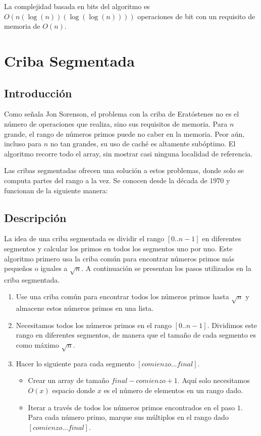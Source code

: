 \documentclass[12pt]{article}
\newcommand{\nl}{\vspace{0.3cm}}
\begin{document}
\nl

La complejidad basada en bits del algoritmo es $O(n(\log(n)) (\log(\log(n))))$ operaciones de bit con un requisito de memoria de $O(n)$.\cite{lpnsaft}

\section{Criba Segmentada}

\subsection{Introducción}

\nl

Como señala Jon Sorenson, el problema con la criba de Eratóstenes no es el número de operaciones que realiza, sino sus requisitos de memoria.\cite{aipns} Para $n$ grande, el rango de números primos puede no caber en la memoria. Peor aún, incluso para $n$ no tan grandes, su uso de caché es altamente subóptimo. El algoritmo recorre todo el array, sin mostrar casi ninguna localidad de referencia.

\nl

Las cribas segmentadas ofrecen una solución a estos problemas, donde solo se computa partes del rango a la vez.\cite{pnap} Se conocen desde la década de 1970 y funcionan de la siguiente manera:\cite{aipns}\cite{ssepap}

\subsection{Descripción}

\nl

La idea de una criba segmentada es dividir el rango $[0 .. n-1]$ en diferentes segmentos y calcular los primos en todos los segmentos uno por uno. Este algoritmo primero usa la criba común para encontrar números primos más pequeños o iguales a $\sqrt{n}$. A continuación se presentan los pasos utilizados en la criba segmentada.\cite{gfgss}

\begin{enumerate}
	\item Use una criba común para encontrar todos los números primos hasta $\sqrt{n}$ y almacene estos números primos en una lista.
	\item Necesitamos todos los números primos en el rango $[0..n-1]$. Dividimos este rango en diferentes segmentos, de manera que el tamaño de cada segmento es como máximo $\sqrt{n}$.
	\item Hacer lo siguiente para cada segmento $[comienzo ... final]$.
	\begin{itemize}
		\item Crear un array de tamaño $final - comienzo + 1$. Aquí solo necesitamos $O(x)$ espacio donde $x$ es el número de elementos en un rango dado.
		\item Iterar a través de todos los números primos encontrados en el paso $1$. Para cada número primo, marque sus múltiplos en el rango dado $[comienzo ... final]$.
	\end{itemize}
\end{enumerate}
\end{document}

